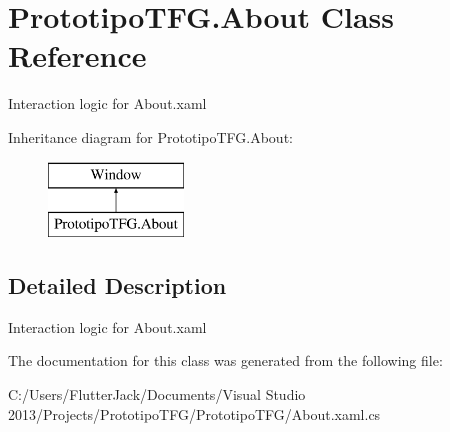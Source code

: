 \hypertarget{class_prototipo_t_f_g_1_1_about}{}\section{Prototipo\+T\+F\+G.\+About Class Reference}
\label{class_prototipo_t_f_g_1_1_about}


Interaction logic for About.\+xaml  


Inheritance diagram for Prototipo\+T\+F\+G.\+About\+:\begin{figure}[H]
\begin{center}
\leavevmode
\includegraphics[height=2.000000cm]{class_prototipo_t_f_g_1_1_about}
\end{center}
\end{figure}


\subsection{Detailed Description}
Interaction logic for About.\+xaml 



The documentation for this class was generated from the following file\+:\begin{DoxyCompactItemize}
\item 
C\+:/\+Users/\+Flutter\+Jack/\+Documents/\+Visual Studio 2013/\+Projects/\+Prototipo\+T\+F\+G/\+Prototipo\+T\+F\+G/About.\+xaml.\+cs\end{DoxyCompactItemize}
